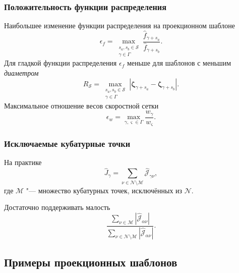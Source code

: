 \documentclass[mathserif]{beamer} %
\newcommand{\bzeta}{\boldsymbol{\zeta}}
\newcommand{\Nu}{\mathcal{N}}
\begin{document}
\begin{frame}
    \frametitle{Положительность функции распределения}
    Наибольшее изменение функции распределения на проекционном шаблоне
    \begin{equation}\label{eq:epsilon_f}
        \epsilon_f = \max_{\substack{s_a,s_b\in\mathcal{S}\\\gamma\in\Gamma}} \frac{\hat{f}_{\gamma+s_a}}{\hat{f}_{\gamma+s_b}}.
    \end{equation}
    Для гладкой функции распределения \(\epsilon_f\) меньше для шаблонов с меньшим \emph{диаметром}
    \begin{equation}\label{eq:stencil_diameter}
        R_\mathcal{S} = \max_{\substack{s_a,s_b\in\mathcal{S}\\\gamma\in\Gamma}}
            \left| \bzeta_{\gamma+s_a} - \bzeta_{\gamma+s_b} \right|.
    \end{equation}
    Максимальное отношение весов скоростной сетки
    \begin{equation}\label{eq:epsilon_w}
        \epsilon_w = \max_{\gamma,\varsigma\in\Gamma} \frac{w_\gamma}{w_\varsigma}.
    \end{equation}
\end{frame}

\begin{frame}
    \frametitle{Исключаемые кубатурные точки}
    На практике
    \begin{equation}\label{eq:discrete_short_ci_discarded}
        \hat{J}_\gamma = \sum_{\nu\in\Nu\setminus\mathcal{M}} \hat{\mathscr{J}}_{\gamma\nu},
    \end{equation}
    где \(\mathcal{M}\) "--- множество кубатурных точек, исключённых из \(\Nu\).
    \vspace{20pt}\pause

    Достаточно поддерживать малость
    \begin{equation}\label{eq:excluded_contribution}
        \frac{\sum_{\nu\in\mathcal{M}} \left| \hat{\mathscr{J}}_{\alpha\nu} \right|}
            {\sum_{\nu\in\Nu\setminus\mathcal{M}} \left| \hat{\mathscr{J}}_{\alpha\nu} \right|}.
    \end{equation}
\end{frame}

\subsection{Примеры проекционных шаблонов}
\end{document}
